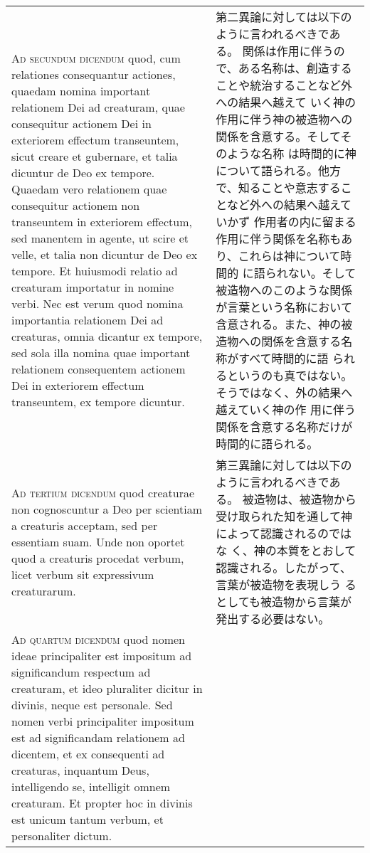 \documentclass[10pt]{jsarticle} %
\begin{document}
\begin{longtable}{p{21em}p{21em}}
\\



{\scshape Ad secundum dicendum} quod, cum relationes consequantur actiones,
quaedam nomina important relationem Dei ad creaturam, quae consequitur
actionem Dei in exteriorem effectum transeuntem, sicut creare et
gubernare, et talia dicuntur de Deo ex tempore. Quaedam vero
relationem quae consequitur actionem non transeuntem in exteriorem
effectum, sed manentem in agente, ut scire et velle, et talia non
dicuntur de Deo ex tempore. Et huiusmodi relatio ad creaturam
importatur in nomine verbi. Nec est verum quod nomina importantia
relationem Dei ad creaturas, omnia dicantur ex tempore, sed sola illa
nomina quae important relationem consequentem actionem Dei in
exteriorem effectum transeuntem, ex tempore dicuntur.

&

第二異論に対しては以下のように言われるべきである。
関係は作用に伴うので、ある名称は、創造することや統治することなど外への結果へ越えて
 いく神の作用に伴う神の被造物への関係を含意する。そしてそのような名称
 は時間的に神について語られる。他方で、知ることや意志することなど外への結果へ越えていかず
作用者の内に留まる作用に伴う関係を名称もあり、これらは神について時間的
 に語られない。そして被造物へのこのような関係が言葉という名称において
 含意される。また、神の被造物への関係を含意する名称がすべて時間的に語
 られるというのも真ではない。そうではなく、外の結果へ越えていく神の作
 用に伴う関係を含意する名称だけが時間的に語られる。

\\



{\scshape Ad tertium dicendum} quod creaturae non cognoscuntur a Deo per
scientiam a creaturis acceptam, sed per essentiam suam. Unde non
oportet quod a creaturis procedat verbum, licet verbum sit expressivum
creaturarum.

&

第三異論に対しては以下のように言われるべきである。
被造物は、被造物から受け取られた知を通して神によって認識されるのではな
 く、神の本質をとおして認識される。したがって、言葉が被造物を表現しう
 るとしても被造物から言葉が発出する必要はない。

\\



{\scshape Ad quartum dicendum} quod nomen ideae principaliter est impositum ad
significandum respectum ad creaturam, et ideo pluraliter dicitur in
divinis, neque est personale. Sed nomen verbi principaliter impositum
est ad significandam relationem ad dicentem, et ex consequenti ad
creaturas, inquantum Deus, intelligendo se, intelligit omnem
creaturam. Et propter hoc in divinis est unicum tantum verbum, et
personaliter dictum.


\end{longtable}
\end{document}
